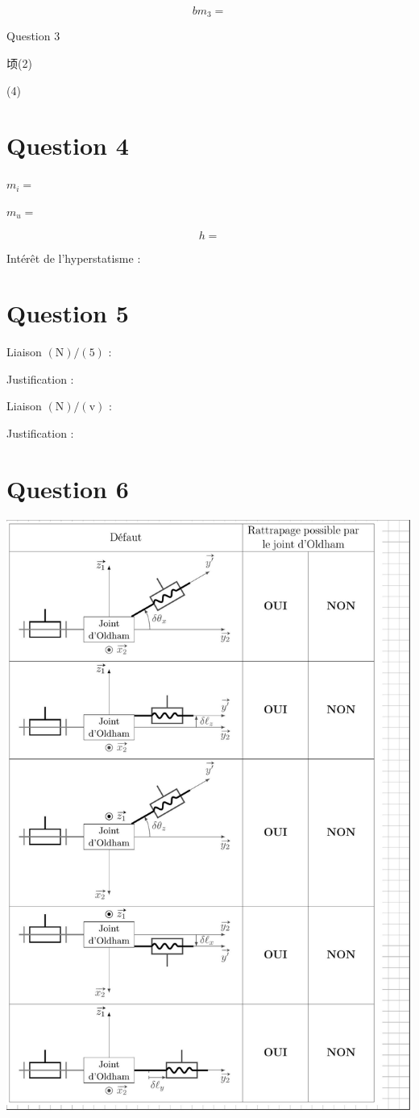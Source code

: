 \documentclass[10pt]{article}
\begin{document}
$$
b m_{3}=
$$

Question 3

顷(2)

(4)

\section*{Question 4}
$m_{i}=$

$m_{u}=$

$$
h=
$$

Intérêt de l'hyperstatisme :

\section*{Question 5}
Liaison $(\mathrm{N}) /(5)$ :

Justification :

Liaison $(\mathrm{N}) /(\mathrm{v})$ :

Justification :

\section*{Question 6}
\begin{center}
\includegraphics[max width=\textwidth]{2024_04_26_3285cfc264024262add0g-23}
\end{center}
\end{document}
